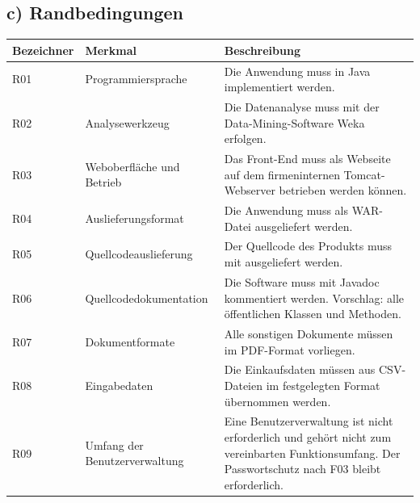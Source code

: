 \documentclass[a4paper,10pt]{article}
\begin{document}
        \subsection*{c) Randbedingungen}
        \begin{longtable}{>{\raggedright\arraybackslash}p{}>{\raggedright\arraybackslash}p{}>{\raggedright\arraybackslash}p{}}
            \toprule
            \textbf{Bezeichner} & \textbf{Merkmal}              & \textbf{Beschreibung}                                                                                                                              \\
            \midrule\endhead
            \bottomrule\endfoot
            R01                 & Programmiersprache            & Die Anwendung muss in Java implementiert werden.                                                                                                   \\
            \midrule
            R02                 & Analysewerkzeug               & Die Datenanalyse muss mit der Data-Mining-Software Weka erfolgen.                                                                                  \\
            \midrule
            R03                 & Weboberfläche und Betrieb     & Das Front-End muss als Webseite auf dem firmeninternen Tomcat-Webserver betrieben werden können.                                                   \\
            \midrule
            R04                 & Auslieferungsformat           & Die Anwendung muss als WAR-Datei ausgeliefert werden.                                                                                              \\
            \midrule
            R05                 & Quellcodeauslieferung         & Der Quellcode des Produkts muss mit ausgeliefert werden.                                                                                           \\
            \midrule
            R06                 & Quellcodedokumentation        & Die Software muss mit Javadoc kommentiert werden. Vorschlag: alle öffentlichen Klassen und Methoden.                                               \\
            \midrule
            R07                 & Dokumentformate               & Alle sonstigen Dokumente müssen im PDF-Format vorliegen.                                                                                           \\
            \midrule
            R08                 & Eingabedaten                  & Die Einkaufsdaten müssen aus CSV-Dateien im festgelegten Format übernommen werden.                                                                 \\
            \midrule
            R09                 & Umfang der Benutzerverwaltung & Eine Benutzerverwaltung ist nicht erforderlich und gehört nicht zum vereinbarten Funktionsumfang. Der Passwortschutz nach F03 bleibt erforderlich. \\
        \end{longtable}
\end{document}
